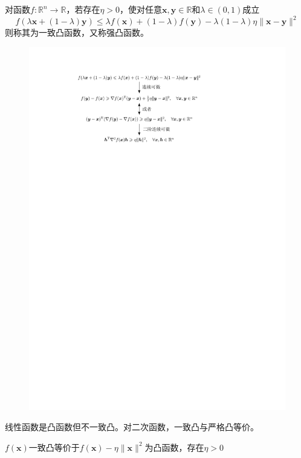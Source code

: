 \begin{definition}
    对函数$f:\mathbb{R}^n\to \mathbb{R}$，若存在$\eta>0$，使对任意$\boldsymbol{x},\boldsymbol{y}\in \mathbb{R}$和$\lambda\in (0,1)$成立
    \[
        f(\lambda\boldsymbol{x}+(1-\lambda)\boldsymbol{y})\leqslant\lambda f(\boldsymbol{x})+(1-\lambda)f(\boldsymbol{y})-\lambda(1-\lambda)\eta\|\boldsymbol{x}-\boldsymbol{y}\|^2
    \]
    则称其为一致凸函数，又称强凸函数。
    \begin{figure}[H]
        \centering
        \includegraphics{image/一致凸函数.pdf}
    \end{figure}
\end{definition}
\begin{note}
    线性函数是凸函数但不一致凸。对二次函数，一致凸与严格凸等价。
\end{note}
\begin{note}
    $f(\boldsymbol{x})$一致凸等价于$f(\boldsymbol{x})-\eta \|\boldsymbol{x}\|^2$为凸函数，存在$\eta>0$
\end{note}
